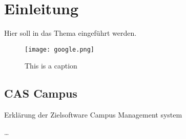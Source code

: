
\chapter{Einleitung}
\label{ch:Introduction}

Hier soll in das Thema eingeführt werden.
\begin{figure}[htp]
\begin{center}
  \texttt{[image: google.png]}
\caption{This is a caption}
\end{center}
\end{figure} 

\section{CAS Campus}
Erklärung der Zielsoftware Campus Management system

\cite{becker2008a}
\dots

